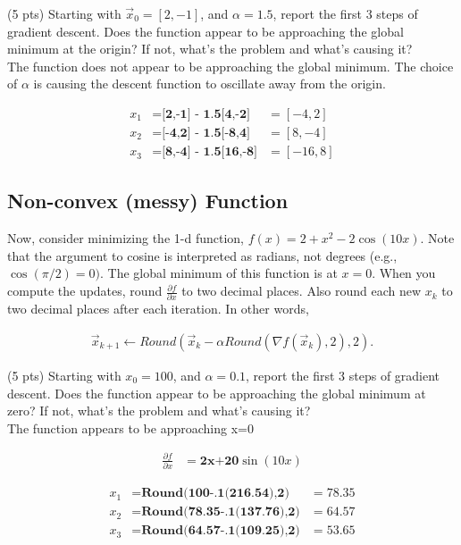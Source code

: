 \documentclass{article}
\begin{document}
(5 pts) Starting with $\vec{x}_0 = [2,-1]$, and $\alpha = 1.5$, report the first 3 steps of gradient descent. Does the function appear to be approaching the global minimum at the origin? If not, what's the problem and what's causing it?\\

The function does not appear to be approaching the global minimum. The choice of $\alpha$ is causing the descent function to oscillate away from the origin. 

\begin{align}
    x_1 &= \textbf{[2,-1] - 1.5[4,-2]} &= [-4,2] \\
    x_2 &= \textbf{[-4,2] - 1.5[-8,4]} &= [8,-4] \\
    x_3 &= \textbf{[8,-4] - 1.5[16,-8]} &= [-16,8]
\end{align}

\subsection{Non-convex (messy) Function}
Now, consider minimizing the 1-d function, $f(x) = 2 + x^2 - 2 \cos(10x)$. Note that the argument to cosine is interpreted as radians, not degrees (e.g., $\cos(\pi/2) = 0)$. The global minimum of this function is at $x=0$. When you compute the updates, round $\frac{\partial f}{\partial x}$ to two decimal places. Also round each new $x_k$ to two decimal places after each iteration. In other words,

\begin{align}
    \vec{x}_{k+1} \leftarrow Round(\vec{x}_k - \alpha Round(\nabla f (\vec{x}_k),2),2).
\end{align}

(5 pts) Starting with $x_0 = 100$, and $\alpha = 0.1$, report the first 3 steps of gradient descent. Does the function appear to be approaching the global minimum at zero? If not, what's the problem and what's causing it? \\

The function appears to be approaching x=0

\begin{align}
    \frac{\partial f}{\partial x} &= \textbf{2x+20$\sin(10x)$}
\end{align}

\begin{align}
    x_1 &= \textbf{Round(100-.1(216.54),2)} &= 78.35 \\
    x_2 &= \textbf{Round(78.35-.1(137.76),2)} &= 64.57 \\
    x_3 &= \textbf{Round(64.57-.1(109.25),2)} &= 53.65
\end{align}
\end{document}
